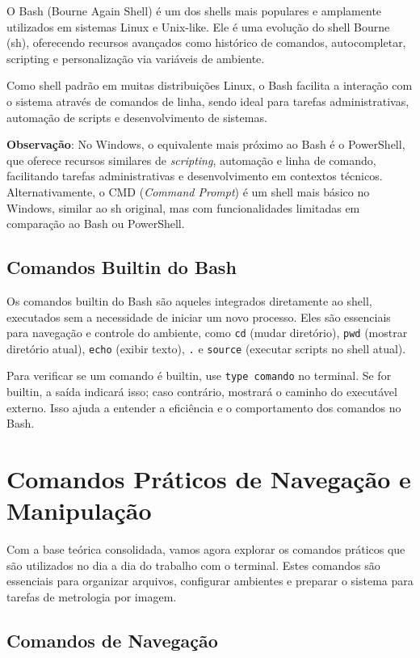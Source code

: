 \documentclass[12pt]{article}
\begin{document}
O Bash (Bourne Again Shell) é um dos shells mais populares e amplamente utilizados em sistemas Linux e Unix-like. Ele é uma evolução do shell Bourne (sh), oferecendo recursos avançados como histórico de comandos, autocompletar, scripting e personalização via variáveis de ambiente.

Como shell padrão em muitas distribuições Linux, o Bash facilita a interação com o sistema através de comandos de linha, sendo ideal para tarefas administrativas, automação de scripts e desenvolvimento de sistemas.

\textbf{Observação}: No Windows, o equivalente mais próximo ao Bash é o PowerShell, que oferece recursos similares de \textit{scripting}, automação e linha de comando, facilitando tarefas administrativas e desenvolvimento em contextos técnicos. Alternativamente, o CMD (\textit{Command Prompt}) é um shell mais básico no Windows, similar ao sh original, mas com funcionalidades limitadas em comparação ao Bash ou PowerShell.

\subsection{Comandos Builtin do Bash}

Os comandos builtin do Bash são aqueles integrados diretamente ao shell, executados sem a necessidade de iniciar um novo processo. Eles são essenciais para navegação e controle do ambiente, como \texttt{cd} (mudar diretório), \texttt{pwd} (mostrar diretório atual), \texttt{echo} (exibir texto), \texttt{.} e \texttt{source} (executar scripts no shell atual).

Para verificar se um comando é builtin, use \texttt{type comando} no terminal. Se for builtin, a saída indicará isso; caso contrário, mostrará o caminho do executável externo. Isso ajuda a entender a eficiência e o comportamento dos comandos no Bash.

\section{Comandos Práticos de Navegação e Manipulação}

Com a base teórica consolidada, vamos agora explorar os comandos práticos que são utilizados no dia a dia do trabalho com o terminal. Estes comandos são essenciais para organizar arquivos, configurar ambientes e preparar o sistema para tarefas de metrologia por imagem.

\subsection{Comandos de Navegação}
\end{document}
